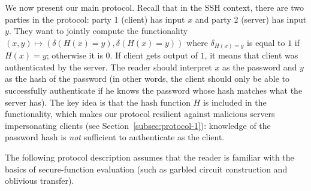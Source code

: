 We now present our main protocol.  Recall that in the SSH context,
there are two parties in the protocol: party 1 (client) has input $x$
and party 2 (server) has input $y$. They want to jointly compute
the functionality $(x,y) \longmapsto ( \delta (H(x) = y),\delta
(H(x) = y))$ where $\delta_{H(x) = y}$ is equal to $1$ if $H(x) =
y$; otherwise it is $0$. If client gets output of $1$, it means that
client was authenticated by the server. The reader should interpret $x$
as the password and $y$ as the hash of the password (in other words,
the client should only be able to successfully authenticate if he knows
the password whose hash matches what the server has).  The key idea is
that the hash function $H$ is included in the functionality, which makes
our protocol resilient against malicious servers impersonating clients
(see Section~\ref{subsec:protocol-1}): knowledge of the password hash
is \emph{not} sufficient to authenticate as the client.

The following protocol description assumes that the reader is familiar
with the basics of secure-function evaluation (such as garbled circuit
construction and oblivious transfer).

